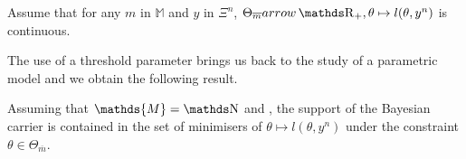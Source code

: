 \begin{as}\label{AS_BAYES_SIEVE_CONTINUOUS}
Assume that for any $m$ in $\mathds{M}$ and $y$ in $\Xi^{n}$, $\Theta_{\overline{m}} arrow \R_{+}, \theta \mapsto l(\theta, y^{n})$ is continuous.
\assEnd
\end{as}

The use of a threshold parameter brings us back to the study of a parametric model and we obtain the following result.

\begin{thm}\label{THM_BAYES_SIEVE_SELF_INFORMATIVE}
Assuming that $\mathds{M} = \N$ and , the support of the Bayesian carrier is contained in the set of minimisers of $\theta \mapsto l(\theta, y^{n})$ under the constraint $\theta \in \Theta_{\overline{m}}$.
\reEnd
\end{thm}

